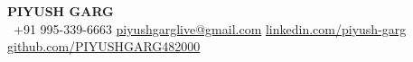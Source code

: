 \begin{center}
    \textbf{\Huge \scshape PIYUSH GARG} \\ \vspace{1pt}
     \ \small +91 995-339-6663 \quad
    \href{mailto:piyushgarglive@gmail.com}{ {piyushgarglive@gmail.com}} \quad
    \href{https://www.linkedin.com/in/piyush-garg-3137b5174/}{ {linkedin.com/piyush-garg}} \quad
    \href{https://github.com/PIYUSHGARG482000}{ {github.com/PIYUSHGARG482000}}
\end{center}